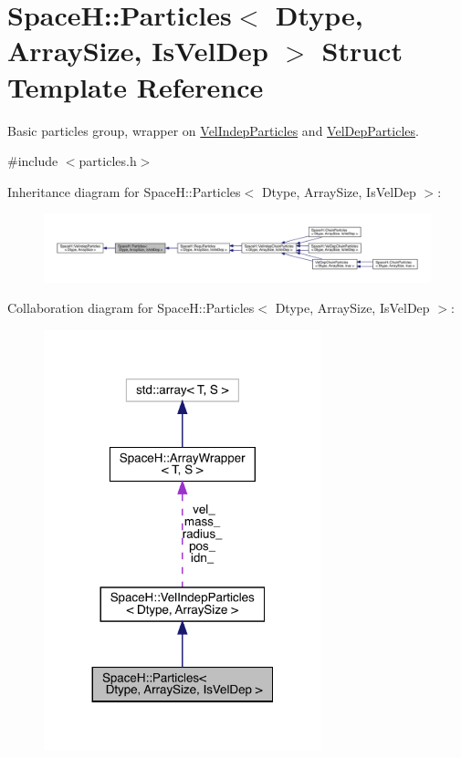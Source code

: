 \hypertarget{struct_space_h_1_1_particles}{}\section{SpaceH\+:\+:Particles$<$ Dtype, Array\+Size, Is\+Vel\+Dep $>$ Struct Template Reference}
\label{struct_space_h_1_1_particles}


Basic particles group, wrapper on \mbox{\hyperlink{class_space_h_1_1_vel_indep_particles}{Vel\+Indep\+Particles}} and \mbox{\hyperlink{class_space_h_1_1_vel_dep_particles}{Vel\+Dep\+Particles}}.  




{\ttfamily \#include $<$particles.\+h$>$}



Inheritance diagram for SpaceH\+:\+:Particles$<$ Dtype, Array\+Size, Is\+Vel\+Dep $>$\+:
\nopagebreak
\begin{figure}[H]
\begin{center}
\leavevmode
\includegraphics[width=350pt]{struct_space_h_1_1_particles__inherit__graph}
\end{center}
\end{figure}


Collaboration diagram for SpaceH\+:\+:Particles$<$ Dtype, Array\+Size, Is\+Vel\+Dep $>$\+:
\nopagebreak
\begin{figure}[H]
\begin{center}
\leavevmode
\includegraphics[width=227pt]{struct_space_h_1_1_particles__coll__graph}
\end{center}
\end{figure}

